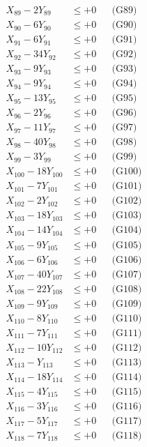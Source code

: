 \documentclass[a4paper,10pt]{article}
\begin{document}
{\begin{align}
X_{89} - 2Y_{89} &\leq +0 && \text{(G89)} \\
X_{90} - 6Y_{90} &\leq +0 && \text{(G90)} \\
X_{91} - 6Y_{91} &\leq +0 && \text{(G91)} \\
X_{92} - 34Y_{92} &\leq +0 && \text{(G92)} \\
X_{93} - 9Y_{93} &\leq +0 && \text{(G93)} \\
\allowbreak
X_{94} - 9Y_{94} &\leq +0 && \text{(G94)} \\
X_{95} - 13Y_{95} &\leq +0 && \text{(G95)} \\
X_{96} - 2Y_{96} &\leq +0 && \text{(G96)} \\
X_{97} - 11Y_{97} &\leq +0 && \text{(G97)} \\
X_{98} - 40Y_{98} &\leq +0 && \text{(G98)} \\
X_{99} - 3Y_{99} &\leq +0 && \text{(G99)} \\
X_{100} - 18Y_{100} &\leq +0 && \text{(G100)} \\
X_{101} - 7Y_{101} &\leq +0 && \text{(G101)} \\
X_{102} - 2Y_{102} &\leq +0 && \text{(G102)} \\
X_{103} - 18Y_{103} &\leq +0 && \text{(G103)} \\
\allowbreak
X_{104} - 14Y_{104} &\leq +0 && \text{(G104)} \\
X_{105} - 9Y_{105} &\leq +0 && \text{(G105)} \\
X_{106} - 6Y_{106} &\leq +0 && \text{(G106)} \\
X_{107} - 40Y_{107} &\leq +0 && \text{(G107)} \\
X_{108} - 22Y_{108} &\leq +0 && \text{(G108)} \\
X_{109} - 9Y_{109} &\leq +0 && \text{(G109)} \\
X_{110} - 8Y_{110} &\leq +0 && \text{(G110)} \\
X_{111} - 7Y_{111} &\leq +0 && \text{(G111)} \\
X_{112} - 10Y_{112} &\leq +0 && \text{(G112)} \\
X_{113} - Y_{113} &\leq +0 && \text{(G113)} \\
\allowbreak
X_{114} - 18Y_{114} &\leq +0 && \text{(G114)} \\
X_{115} - 4Y_{115} &\leq +0 && \text{(G115)} \\
X_{116} - 3Y_{116} &\leq +0 && \text{(G116)} \\
X_{117} - 5Y_{117} &\leq +0 && \text{(G117)} \\
X_{118} - 7Y_{118} &\leq +0 && \text{(G118)} \\

\end{align}}
\end{document}
